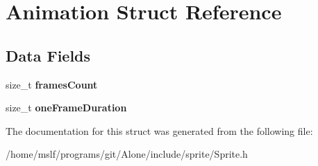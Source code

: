 \hypertarget{struct_animation}{}\section{Animation Struct Reference}
\label{struct_animation}
\subsection*{Data Fields}
\begin{DoxyCompactItemize}
\item 
\hypertarget{struct_animation_ace242ca3529b4a5ac307484da8872fd1}{}\label{struct_animation_ace242ca3529b4a5ac307484da8872fd1} 
size\+\_\+t {\bfseries frames\+Count}
\item 
\hypertarget{struct_animation_a4890c8e40c8a418c675673efc57e86b9}{}\label{struct_animation_a4890c8e40c8a418c675673efc57e86b9} 
size\+\_\+t {\bfseries one\+Frame\+Duration}
\end{DoxyCompactItemize}


The documentation for this struct was generated from the following file\+:\begin{DoxyCompactItemize}
\item 
/home/mslf/programs/git/\+Alone/include/sprite/Sprite.\+h\end{DoxyCompactItemize}
